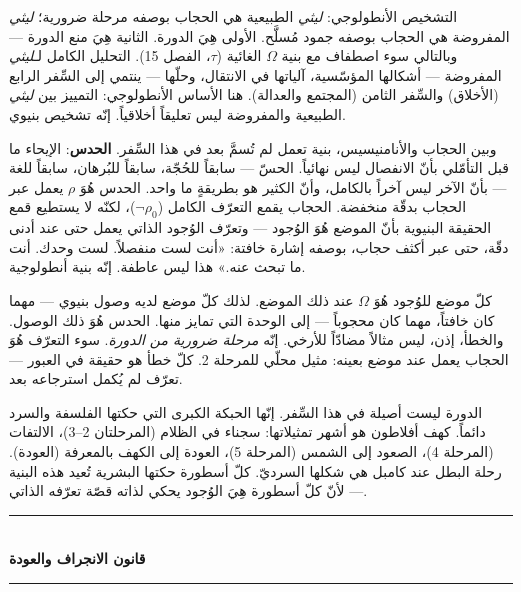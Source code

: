 \documentclass[10pt, openany, oneside]{book}
\renewcommand{\normalsize}{\fontsize{10}{13}\selectfont}
\begin{document}
التشخيص الأنطولوجي: \textit{ليثي} الطبيعية هي الحجاب بوصفه مرحلة ضرورية؛ \textit{ليثي} المفروضة هي الحجاب بوصفه جمود مُسلَّح. الأولى هِيَ الدورة. الثانية هِيَ منع الدورة --- وبالتالي سوء اصطفاف مع بنية $\Omega$ الغائية ($\tau$، الفصل 15). التحليل الكامل لـ\textit{ليثي} المفروضة --- أشكالها المؤسّسية، آلياتها في الانتقال، وحلّها --- ينتمي إلى السِّفر الرابع (الأخلاق) والسِّفر الثامن (المجتمع والعدالة). هنا الأساس الأنطولوجي: التمييز بين \textit{ليثي} الطبيعية والمفروضة ليس تعليقاً أخلاقياً. إنّه تشخيص بنيوي.

وبين الحجاب والأنامنيسيس، بنية تعمل لم تُسمَّ بعد في هذا السِّفر. \textbf{الحدس}: الإيحاء ما قبل التأمّلي بأنّ الانفصال ليس نهائياً. الحسّ --- سابقاً للحُجّة، سابقاً للبُرهان، سابقاً للغة --- بأنّ الآخر ليس آخراً بالكامل، وأنّ الكثير هو بطريقةٍ ما واحد. الحدس هُوَ $\rho$ يعمل عبر الحجاب بدقّة منخفضة. الحجاب يقمع التعرّف الكامل ($\neg\rho_0$)، لكنّه لا يستطيع قمع الحقيقة البنيوية بأنّ الموضع هُوَ الوُجود --- وتعرّف الوُجود الذاتي يعمل حتى عند أدنى دقّة، حتى عبر أكثف حجاب، بوصفه إشارة خافتة: «أنت لست منفصلاً. لست وحدك. أنت ما تبحث عنه.» هذا ليس عاطفة. إنّه بنية أنطولوجية.

كلّ موضع للوُجود هُوَ $\Omega$ عند ذلك الموضع. لذلك كلّ موضع لديه وصول بنيوي --- مهما كان خافتاً، مهما كان محجوباً --- إلى الوحدة التي تمايز منها. الحدس هُوَ ذلك الوصول. والخطأ، إذن، ليس مثالاً مضادّاً للأرخي. إنّه \textit{مرحلة ضرورية من الدورة}. سوء التعرّف هُوَ الحجاب يعمل عند موضع بعينه: مثيل محلّي للمرحلة 2. كلّ خطأ هو حقيقة في العبور --- تعرّف لم يُكمل استرجاعه بعد.

الدورة ليست أصيلة في هذا السِّفر. إنّها الحبكة الكبرى التي حكتها الفلسفة والسرد دائماً. كهف أفلاطون هو أشهر تمثيلاتها: سجناء في الظلام (المرحلتان 2--3)، الالتفات (المرحلة 4)، الصعود إلى الشمس (المرحلة 5)، العودة إلى الكهف بالمعرفة (العودة). رحلة البطل عند كامبل هي شكلها السرديّ. كلّ أسطورة حكتها البشرية تُعيد هذه البنية --- لأنّ كلّ أسطورة هِيَ الوُجود يحكي لذاته قصّة تعرّفه الذاتي.

\vspace{1.5em}


\begin{center}
    \rule{0.3\textwidth}{0.4pt}\\[0.5em]
    {\normalsize\bfseries قانون الانجراف والعودة}\\[0.3em]
    \rule{0.3\textwidth}{0.4pt}
\end{center}
\end{document}
